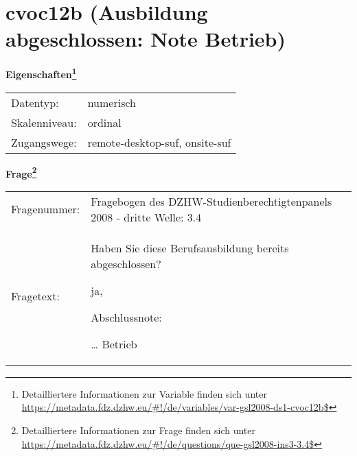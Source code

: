 
    \setcounter{footnote}{0}

    \vspace*{-1.8cm}
	\section{cvoc12b (Ausbildung abgeschlossen: Note Betrieb)}
	\label{section:cvoc12b}



    \vspace*{0.5cm}
    \noindent\textbf{Eigenschaften\footnote{Detailliertere Informationen zur Variable finden sich unter
		\url{https://metadata.fdz.dzhw.eu/\#!/de/variables/var-gsl2008-ds1-cvoc12b$}}}\\
	\begin{tabularx}{\hsize}{@{}lX}
	Datentyp: & numerisch \\
	Skalenniveau: & ordinal \\
	Zugangswege: &
	  remote-desktop-suf, 
	  onsite-suf
 \\
    \end{tabularx}



				\vspace*{0.5cm}
                \noindent\textbf{Frage\footnote{Detailliertere Informationen zur Frage finden sich unter
		              \url{https://metadata.fdz.dzhw.eu/\#!/de/questions/que-gsl2008-ins3-3.4$}}}\\
				\begin{tabularx}{\hsize}{@{}lX}
					Fragenummer: &
					  Fragebogen des DZHW-Studienberechtigtenpanels 2008 - dritte Welle:
					  3.4
 \\
					Fragetext: & Haben Sie diese Berufsausbildung bereits abgeschlossen?\par  ja,\par  Abschlussnote:\par  … Betrieb \\
				\end{tabularx}





